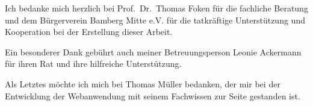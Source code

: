 \documentclass[
11pt, %
ngerman, %
singlespacing, %
parskip, %
nohyperref, %
consistentlayout, %
]{PSIThesis} %
\begin{document}

\begin{acknowledgements}
%
Ich bedanke mich herzlich bei Prof.\ Dr.\ Thomas Foken für die fachliche Beratung und dem Bürgerverein Bamberg Mitte e.V. für die tatkräftige Unterstützung und Kooperation bei der Erstellung dieser Arbeit.

Ein besonderer Dank gebührt auch meiner Betreuungsperson Leonie Ackermann für ihren Rat und ihre hilfreiche Unterstützung.

Als Letztes möchte ich mich bei Thomas Müller bedanken, der mir bei der Entwicklung der Webanwendung mit seinem Fachwissen zur Seite gestanden ist.
\end{acknowledgements}



\cleardoublepage
{
\hypersetup{linkcolor=black}
\tableofcontents %
}
\restoregeometry



\mainmatter%
\pagestyle{thesis} %

\newcommand{\keyword}[1]{\textbf{#1}}
\newcommand{\tabhead}[1]{\textbf{#1}}
\newcommand{\code}[1]{\texttt{#1}}
\newcommand{\file}[1]{\texttt{#1}}
\newcommand{\option}[1]{\texttt{\itshape#1}}
\end{document}
